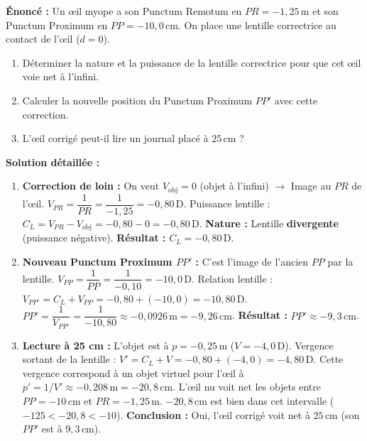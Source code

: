 \documentclass[11pt]{article}
\begin{document}
\begin{exoresolu}
\textbf{Énoncé :} Un œil myope a son Punctum Remotum en $PR = -1,25\,\text{m}$ et son Punctum Proximum en $PP = -10,0\,\text{cm}$. On place une lentille correctrice au contact de l'œil ($d=0$).
\begin{enumerate}
    \item Déterminer la nature et la puissance de la lentille correctrice pour que cet œil voie net à l'infini.
    \item Calculer la nouvelle position du Punctum Proximum $PP'$ avec cette correction.
    \item L'œil corrigé peut-il lire un journal placé à $25\,\text{cm}$ ?
\end{enumerate}

\tcblower
\textbf{Solution détaillée :}
\begin{enumerate}
    \item \textbf{Correction de loin :} On veut $V_{\text{obj}} = 0$ (objet à l'infini) $\to$ Image au $PR$ de l'œil.
    $V_{PR} = \dfrac{1}{PR} = \dfrac{1}{-1,25} = -0,80\,\text{D}$.
    Puissance lentille : $C_L = V_{PR} - V_{\text{obj}} = -0,80 - 0 = -0,80\,\text{D}$.
    \textbf{Nature :} Lentille \textbf{divergente} (puissance négative).
    \textbf{Résultat :} $C_L = -0,80\,\text{D}$.
    \item \textbf{Nouveau Punctum Proximum $PP'$ :} C'est l'image de l'ancien $PP$ par la lentille.
    $V_{PP} = \dfrac{1}{PP} = \dfrac{1}{-0,10} = -10,0\,\text{D}$.
    Relation lentille : $V_{PP'} = C_L + V_{PP} = -0,80 + (-10,0) = -10,80\,\text{D}$.
    $PP' = \dfrac{1}{V_{PP'}} = \dfrac{1}{-10,80} \approx -0,0926\,\text{m} = -9,26\,\text{cm}$.
    \textbf{Résultat :} $PP' \approx -9,3\,\text{cm}$.
    \item \textbf{Lecture à 25 cm :} L'objet est à $p = -0,25\,\text{m}$ ($V = -4,0\,\text{D}$).
    Vergence sortant de la lentille : $V' = C_L + V = -0,80 + (-4,0) = -4,80\,\text{D}$.
    Cette vergence correspond à un objet virtuel pour l'œil à $p' = 1/V' \approx -0,208\,\text{m} = -20,8\,\text{cm}$.
    L'œil nu voit net les objets entre $PP=-10\,\text{cm}$ et $PR=-1,25\,\text{m}$.
    $-20,8\,\text{cm}$ est bien dans cet intervalle ($-125 < -20,8 < -10$).
    \textbf{Conclusion :} Oui, l'œil corrigé voit net à $25\,\text{cm}$ (son $PP'$ est à $9,3\,\text{cm}$).
\end{enumerate}
\end{exoresolu}
\end{document}

